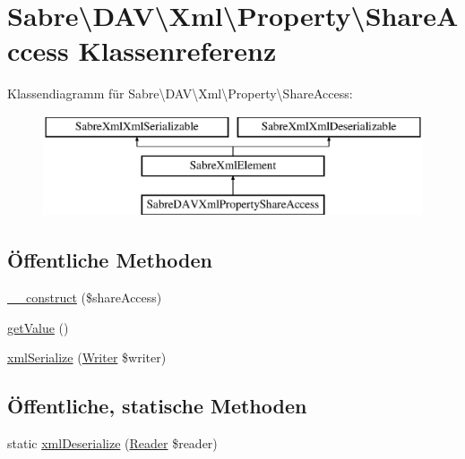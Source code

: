 \hypertarget{class_sabre_1_1_d_a_v_1_1_xml_1_1_property_1_1_share_access}{}\section{Sabre\textbackslash{}D\+AV\textbackslash{}Xml\textbackslash{}Property\textbackslash{}Share\+Access Klassenreferenz}
\label{class_sabre_1_1_d_a_v_1_1_xml_1_1_property_1_1_share_access}
Klassendiagramm für Sabre\textbackslash{}D\+AV\textbackslash{}Xml\textbackslash{}Property\textbackslash{}Share\+Access\+:\begin{figure}[H]
\begin{center}
\leavevmode
\includegraphics[height=3.000000cm]{class_sabre_1_1_d_a_v_1_1_xml_1_1_property_1_1_share_access}
\end{center}
\end{figure}
\subsection*{Öffentliche Methoden}
\begin{DoxyCompactItemize}
\item 
\mbox{\hyperlink{class_sabre_1_1_d_a_v_1_1_xml_1_1_property_1_1_share_access_a63cbf6b112aa31f3a0edfa27a7cdac02}{\+\_\+\+\_\+construct}} (\$share\+Access)
\item 
\mbox{\hyperlink{class_sabre_1_1_d_a_v_1_1_xml_1_1_property_1_1_share_access_a96845e61098d847609ddc3bd08a4d1d3}{get\+Value}} ()
\item 
\mbox{\hyperlink{class_sabre_1_1_d_a_v_1_1_xml_1_1_property_1_1_share_access_ac1eea445764ba690b291b72db04e16c7}{xml\+Serialize}} (\mbox{\hyperlink{class_sabre_1_1_xml_1_1_writer}{Writer}} \$writer)
\end{DoxyCompactItemize}
\subsection*{Öffentliche, statische Methoden}
\begin{DoxyCompactItemize}
\item 
static \mbox{\hyperlink{class_sabre_1_1_d_a_v_1_1_xml_1_1_property_1_1_share_access_a5c998115b93a9410f93252aa4e448d5c}{xml\+Deserialize}} (\mbox{\hyperlink{class_sabre_1_1_xml_1_1_reader}{Reader}} \$reader)
\end{DoxyCompactItemize}
